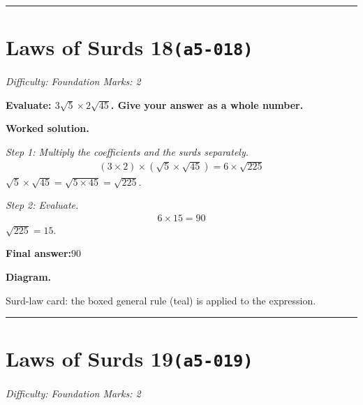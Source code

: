 \documentclass[11pt]{article}
\newcommand{\question}[1]{\par\medskip\noindent\textbf{#1}\par}
\begin{document}
\medskip\hrule

\section*{Laws of Surds 18\quad\small\texttt{(a5-018)}}
\textit{Difficulty: Foundation \quad\textbar\quad Marks: 2}

\question{Evaluate: \( 3\sqrt{5} \times 2\sqrt{45} \). Give your answer as a whole number.}

\textbf{Worked solution.}

\textit{Step 1: Multiply the coefficients and the surds separately.}
\[\begin{gathered}
(3 \times 2) \times (\sqrt{5} \times \sqrt{45}) = 6 \times \sqrt{225}
\end{gathered}\]
\( \sqrt{5} \times \sqrt{45} = \sqrt{5 \times 45} = \sqrt{225} \).

\textit{Step 2: Evaluate.}
\[\begin{gathered}
6 \times 15 = 90
\end{gathered}\]
\( \sqrt{225} = 15 \).

\begin{answerbox}
\textbf{Final answer:}\quad \(\displaystyle 90\)
\end{answerbox}
\textbf{Diagram.}

\begin{center}
\end{center}
\small Surd-law card: the boxed general rule (teal) is applied to the expression.\normalsize

\medskip\hrule

\section*{Laws of Surds 19\quad\small\texttt{(a5-019)}}
\textit{Difficulty: Foundation \quad\textbar\quad Marks: 2}
\end{document}
